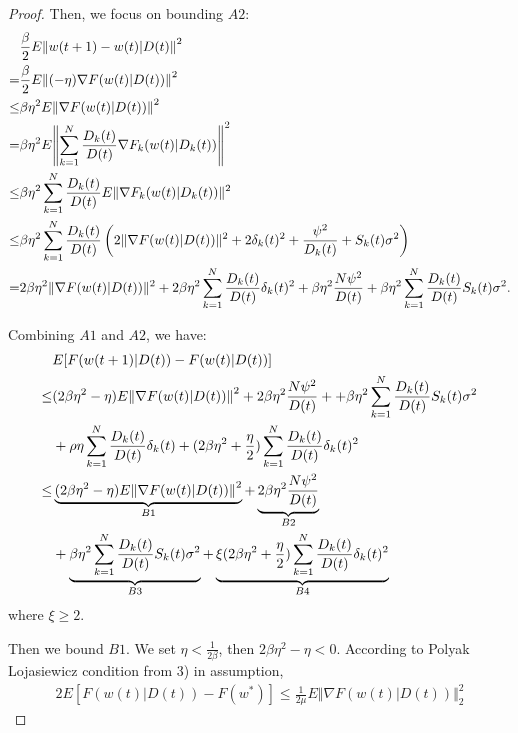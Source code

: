 \documentclass{article}
\theoremstyle{plain}
\theoremstyle{definition}
\theoremstyle{remark}
\begin{document}
\begin{proof}
  Then, we focus on bounding $A2$:
  \begin{align}
         & \frac{\beta}{2} E {\Vert w(t+1) - w(t) | D(t) \Vert}^2 \notag \\
    =    & \frac{\beta}{2} E {\Vert (-\eta) \nabla F(w(t)|D(t))\Vert}^2 \notag \\
    \leq & \beta\eta^2 E{\Vert\nabla F(w(t)|D(t))\Vert}^2 \notag \\
    =    & \beta\eta^2 E{\left\Vert \sum_{k=1}^{N} \frac{D_k(t)}{D(t)} \nabla F_k(w(t)|D_k(t))\right\Vert}^2 \notag \\
    \leq & \beta\eta^2 \sum_{k=1}^{N} \frac{D_k(t)}{D(t)} E\Vert\nabla F_k(w(t)|D_k(t))\Vert^2 \notag \\
    \leq & \beta\eta^2 \sum_{k=1}^{N} \frac{D_k(t)}{D(t)} \left(2\Vert\nabla F(w(t)|D(t))\Vert^2 + 2\delta_k(t)^2 + \frac{\psi^2}{D_k(t)} + S_k(t)\sigma^2\right) \notag \\
    =    & 2\beta\eta^2 \Vert\nabla F(w(t)|D(t))\Vert^2 + 2\beta\eta^2 \sum_{k=1}^{N} \frac{D_k(t)}{D(t)} \delta_k(t)^2 + \beta\eta^2 \frac{N\psi^2}{D(t)} + \beta\eta^2 \sum_{k=1}^{N} \frac{D_k(t)}{D(t)} S_k(t) \sigma^2.
  \end{align}

  Combining $A1$ and $A2$, we have:
  \begin{align}
         & E[F(w(t+1)|D(t)) - F(w(t)|D(t))] \notag \\
    \leq & (2\beta \eta^2 - \eta) E{\Vert\nabla F(w(t)|D(t))\Vert}^2 + 2\beta\eta^2 \frac{N\psi^2}{D(t)} + + \beta\eta^2 \sum_{k=1}^{N} \frac{D_k(t)}{D(t)} S_k(t) \sigma^2 \notag \\
         & + \rho \eta \sum_{k=1}^{N} \frac{D_k(t)}{D(t)} \delta_k(t) + (2\beta\eta^2 + \frac{\eta}{2}) \sum_{k=1}^{N} \frac{D_k(t)}{D(t)} \delta_k(t)^2 \notag \\
    \leq & \underbrace{(2\beta \eta^2 - \eta) E{\Vert\nabla F(w(t)|D(t))\Vert}^2}_{B1} + \underbrace{2\beta\eta^2 \frac{N\psi^2}{D(t)}}_{B2} \notag \\
         & + \underbrace{\beta\eta^2 \sum_{k=1}^{N} \frac{D_k(t)}{D(t)} S_k(t) \sigma^2}_{B3} + \underbrace{\xi(2\beta\eta^2 + \frac{\eta}{2}) \sum_{k=1}^{N} \frac{D_k(t)}{D(t)} \delta_k(t)^2}_{B4}
  \end{align}
  where $\xi \geq 2$.

  Then we bound $B1$. We set $\eta < \frac{1}{2\beta}$, then $2\beta\eta^2 - \eta < 0$. According to Polyak Lojasiewicz condition from 3) in assumption,
  \begin{alignat}{2}
    E[F(w(t)|D(t))-F(w^*)] \leq \frac{1}{2\mu}E{\Vert\nabla F(w(t)|D(t))\Vert}_2^2
  \end{alignat}


\end{proof}
\end{document}
